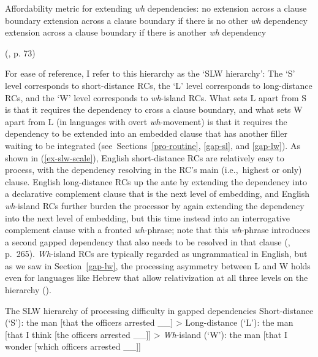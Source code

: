 \pex 
Affordability metric for extending \textit{wh} dependencies:\label{ex-slw-ogrady}
\a no extension across a clause boundary
\a extension across a clause boundary if there is no other \textit{wh} dependency
\a extension across a clause boundary if there is another \textit{wh} dependency\par\nobreak\vspace{5pt}
\hfill (\cite{ogrady2022a}, p. 73)
\xe 

\noindent For ease of reference, I refer to this hierarchy as the `SLW hierarchy'\footnotemark{}: The `S' level corresponds to short-distance RCs, the `L' level corresponds to long-distance RCs, and the `W' level corresponds to \textit{wh}-island RCs. What sets L apart from S is that it requires the dependency to cross a clause boundary, and what sets W apart from L (in languages with overt \textit{wh}-movement) is that it requires the dependency to be extended into an embedded clause that has another filler waiting to be integrated (see~Sections~\ref{pro-routine}, \ref{gap-sl}, and \ref{gap-lw}). As shown in (\ref{ex-slw-scale}), English short-distance RCs are relatively easy to process, with the dependency resolving in the RC's main (i.e.,~highest or only) clause. English long-distance RCs up the ante by extending the dependency into a declarative complement clause that is the next level of embedding, and English \textit{wh}-island RCs further burden the processor by again extending the dependency into the next level of embedding, but this time instead into an interrogative complement clause with a fronted \textit{wh}-phrase; note that this \textit{wh}-phrase introduces a second gapped dependency that also needs to be resolved in that clause (\cite{kluender1998}, p.~265). \textit{Wh}-island RCs are typically regarded as ungrammatical in English, but as we saw in Section~\ref{gap-lw}, the processing asymmetry between L and W holds even for languages like Hebrew that allow relativization at all three levels on the hierarchy (\cite{keshev.meltzer-asscher2019}).


\pex\label{ex-slw-scale}
The SLW hierarchy of processing difficulty in gapped dependencies
\a Short-distance (`S'):\vspace{5pt}\newline
the man [that the officers arrested \_\_] >
\a Long-distance (`L'):\vspace{5pt}\newline
the man [that I think [the officers arrested \_\_]] >
\a \textit{Wh}-island (`W'):\vspace{5pt}\newline
\ljudge*the man [that I wonder [which officers arrested \_\_]]
\xe

